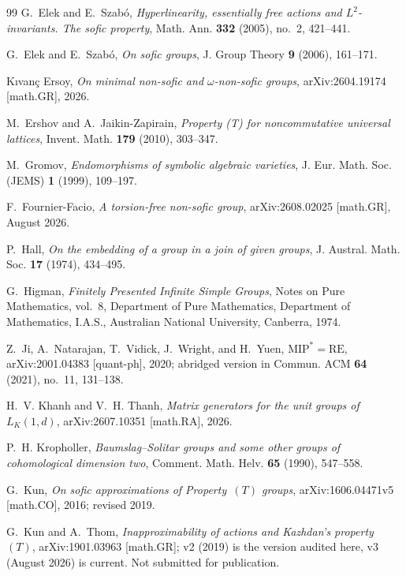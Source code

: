 \documentclass[11pt]{amsart}
\theoremstyle{definition}
\theoremstyle{plain}
\begin{document}
\begin{thebibliography}{99}
G.~Elek and E.~Szab\'o,
\emph{Hyperlinearity, essentially free actions and $L^2$-invariants.  The sofic property},
Math. Ann. \textbf{332} (2005), no.~2, 421--441.

G.~Elek and E.~Szab\'o,
\emph{On sofic groups},
J. Group Theory \textbf{9} (2006), 161--171.

K{\i}van\c{c} Ersoy,
\emph{On minimal non-sofic and $\omega$-non-sofic groups},
arXiv:2604.19174 [math.GR], 2026.

M.~Ershov and A.~Jaikin-Zapirain,
\emph{Property (T) for noncommutative universal lattices},
Invent. Math. \textbf{179} (2010), 303--347.

M.~Gromov,
\emph{Endomorphisms of symbolic algebraic varieties},
J. Eur. Math. Soc. (JEMS) \textbf{1} (1999), 109--197.

F.~Fournier-Facio,
\emph{A torsion-free non-sofic group},
arXiv:2608.02025 [math.GR], August 2026.

P.~Hall,
\emph{On the embedding of a group in a join of given groups},
J. Austral. Math. Soc. \textbf{17} (1974), 434--495.

G.~Higman,
\emph{Finitely Presented Infinite Simple Groups},
Notes on Pure Mathematics, vol.~8,
Department of Pure Mathematics, Department of Mathematics, I.A.S.,
Australian National University, Canberra, 1974.

Z.~Ji, A.~Natarajan, T.~Vidick, J.~Wright, and H.~Yuen,
\emph{$\mathrm{MIP}^*=\mathrm{RE}$},
arXiv:2001.04383 [quant-ph], 2020; abridged version in Commun. ACM \textbf{64} (2021), no.~11, 131--138.

H.~V. Khanh and V.~H. Thanh,
\emph{Matrix generators for the unit groups of $L_K(1,d)$},
arXiv:2607.10351 [math.RA], 2026.

P.~H. Kropholler,
\emph{Baumslag--Solitar groups and some other groups of cohomological dimension two},
Comment. Math. Helv. \textbf{65} (1990), 547--558.

G.~Kun,
\emph{On sofic approximations of Property~$(T)$ groups},
arXiv:1606.04471v5 [math.CO], 2016; revised 2019.

G.~Kun and A.~Thom,
\emph{Inapproximability of actions and Kazhdan's property~$(T)$},
arXiv:1901.03963 [math.GR]; v2 (2019) is the version audited here, v3 (August 2026) is current.  Not submitted for publication.


\end{thebibliography}
\end{document}
